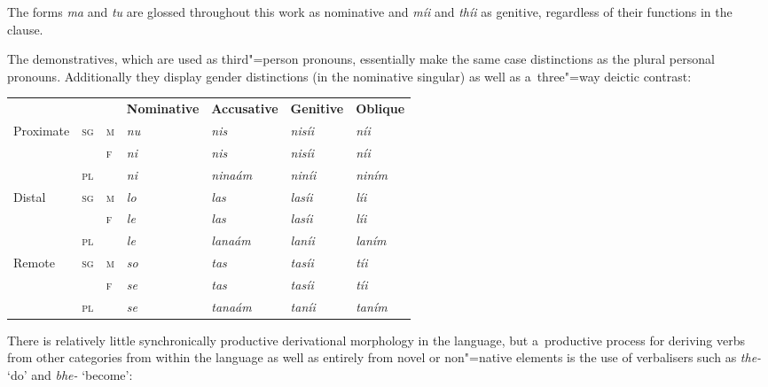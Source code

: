 The forms \textit{ma} and \textit{tu} are glossed throughout this work as nominative and \textit{míi} and \textit{thíi} as genitive, regardless of their functions in the clause.


The demonstratives, which are used as third"=person pronouns, essentially make the same case distinctions as the plural personal pronouns. Additionally they display gender distinctions (in the nominative singular) as well as a~three"=way deictic contrast:


\begin{table}[H]
\begin{tabular}{ l l l l | l | l | l }
&
&
&
\textbf{Nominative} &
\textbf{Accusative} &
\textbf{Genitive} &
\textbf{Oblique} \\
Proximate &
\textsc{sg} &
\textsc{m} &
\textit{nu} &
\textit{nis} &
\textit{nisíi} &
\textit{níi} \\\cline{4-4}
&
&
\textsc{f} &
\textit{ni} &
\textit{nis} &
\textit{nisíi} &
\textit{níi} \\\cline{5-7}
&
\textsc{pl} &
&
\textit{ni} &
\textit{ninaám} &
\textit{niníi} &
\textit{niním} \\\cline{4-7}
Distal &
\textsc{sg} &
\textsc{m} &
\textit{lo} &
\textit{las} &
\textit{lasíi} &
\textit{líi} \\\cline{4-4}
&
&
\textsc{f} &
\textit{le} &
\textit{las} &
\textit{lasíi} &
\textit{líi} \\\cline{5-7}
&
\textsc{pl} &
&
\textit{le} &
\textit{lanaám} &
\textit{laníi} &
\textit{laním} \\\cline{4-7}
Remote &
\textsc{sg} &
\textsc{m} &
\textit{so} &
\textit{tas} &
\textit{tasíi} &
\textit{tíi} \\\cline{4-4}
&
&
\textsc{f} &
\textit{se} &
\textit{tas} &
\textit{tasíi} &
\textit{tíi} \\\cline{5-7}
&
\textsc{pl} &
&
\textit{se} &
\textit{tanaám} &
\textit{taníi} &
\textit{taním} \\
\end{tabular}
\end{table}


There is relatively little synchronically productive derivational morphology in the language, but a~productive process for deriving verbs from other categories from within the language as well as entirely from novel or non"=native elements is the use of verbalisers such as \textit{the-} `do' and \textit{bhe-} `become':


